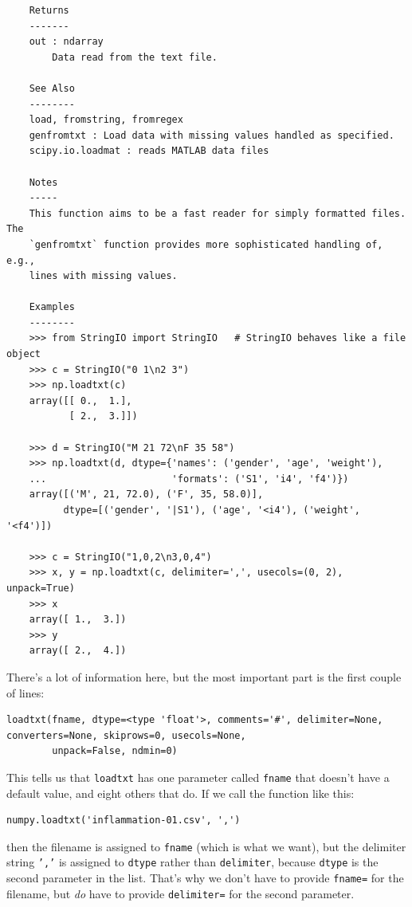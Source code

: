 \documentclass{book}
\begin{document}
\begin{verbatim}
    Returns
    -------
    out : ndarray
        Data read from the text file.

    See Also
    --------
    load, fromstring, fromregex
    genfromtxt : Load data with missing values handled as specified.
    scipy.io.loadmat : reads MATLAB data files

    Notes
    -----
    This function aims to be a fast reader for simply formatted files.  The
    `genfromtxt` function provides more sophisticated handling of, e.g.,
    lines with missing values.

    Examples
    --------
    >>> from StringIO import StringIO   # StringIO behaves like a file object
    >>> c = StringIO("0 1\n2 3")
    >>> np.loadtxt(c)
    array([[ 0.,  1.],
           [ 2.,  3.]])

    >>> d = StringIO("M 21 72\nF 35 58")
    >>> np.loadtxt(d, dtype={'names': ('gender', 'age', 'weight'),
    ...                      'formats': ('S1', 'i4', 'f4')})
    array([('M', 21, 72.0), ('F', 35, 58.0)],
          dtype=[('gender', '|S1'), ('age', '<i4'), ('weight', '<f4')])

    >>> c = StringIO("1,0,2\n3,0,4")
    >>> x, y = np.loadtxt(c, delimiter=',', usecols=(0, 2), unpack=True)
    >>> x
    array([ 1.,  3.])
    >>> y
    array([ 2.,  4.])
\end{verbatim}

There's a lot of information here, but the most important part is the
first couple of lines:

\begin{verbatim}
loadtxt(fname, dtype=<type 'float'>, comments='#', delimiter=None, converters=None, skiprows=0, usecols=None,
        unpack=False, ndmin=0)
\end{verbatim}

This tells us that \texttt{loadtxt} has one parameter called
\texttt{fname} that doesn't have a default value, and eight others that
do. If we call the function like this:

\begin{verbatim}
numpy.loadtxt('inflammation-01.csv', ',')
\end{verbatim}

then the filename is assigned to \texttt{fname} (which is what we want),
but the delimiter string \texttt{','} is assigned to \texttt{dtype}
rather than \texttt{delimiter}, because \texttt{dtype} is the second
parameter in the list. That's why we don't have to provide
\texttt{fname=} for the filename, but \emph{do} have to provide
\texttt{delimiter=} for the second parameter.
\end{document}
